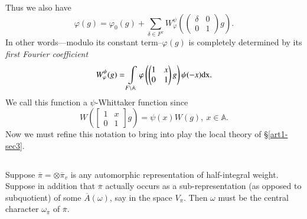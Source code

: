 Thus we also have
\begin{equation}
\varphi (g)=\varphi_{0}(g)+\sum\limits_{\delta \in F^{x}}W^{\psi}_{\varphi}\left(\left(\begin{matrix} \delta & 0\\ 0 & 1\end{matrix}\right)g\right).\label{art1-eq10.1.5}
\end{equation}
In other words---modulo its constant term--$\varphi(g)$ is completely determined by its {\em first Fourier coefficient}
\begin{equation}
W^{\psi}_{\varphi}(g)=\int\limits_{F\backslash \mathbb{A}}\varphi\left(\left(\begin{matrix} 1 & x\\ 0 & 1\end{matrix}\right)g\right)\psi(-x)\mathrm{dx}.
\end{equation}
We call this function a $\psi$-Whittaker function since
$$
W\left(\begin{bmatrix} 1 & x \\ 0 & 1\end{bmatrix} g\right)=\psi(x)W(g), \ x\in \mathbb{A}.
$$
Now we must refine this notation to bring into play the local theory of \S\ref{art1-sec3}.

\subsection{}\label{art1-sec10.2}
Suppose $\overline{\pi}=\otimes \overline{\pi}_{v}$ is any automorphic representation of half-integral weight. Suppose in addition that $\overline{\pi}$ actually occurs as a sub-representation (as opposed to subquotient) of some $\overline{A}(\omega)$, say in the space $V_{\overline{\pi}}$. Then $\omega$ must be the central character $\omega_{\overline{\pi}}$ of $\overline{\pi}$.

